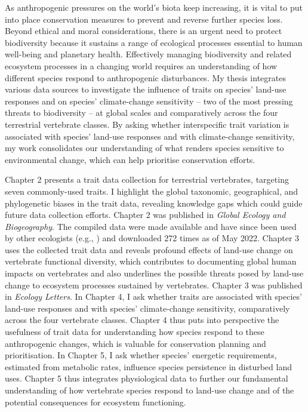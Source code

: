 As anthropogenic pressures on the world’s biota keep increasing, it is vital to put into place conservation measures to prevent and reverse further species loss. Beyond ethical and moral considerations, there is an urgent need to protect biodiversity because it sustains a range of ecological processes essential to human well-being and planetary health. Effectively managing biodiversity and related ecosystem processes in a changing world requires an understanding of how different species respond to anthropogenic disturbances. My thesis integrates various data sources to investigate the influence of traits on species' land-use responses and on species' climate-change sensitivity -- two of the most pressing threats to biodiversity -- at global scales and comparatively across the four terrestrial vertebrate classes. By asking whether interspecific trait variation is associated with species' land-use responses and with climate-change sensitivity, my work consolidates our understanding of what renders species sensitive to environmental change, which can help prioritise conservation efforts. 
 
Chapter 2 presents a trait data collection for terrestrial vertebrates, targeting seven commonly-used traits. I highlight the global taxonomic, geographical, and phylogenetic biases in the trait data, revealing knowledge gaps which could guide future data collection efforts. Chapter 2 was published in \textit{Global Ecology and Biogeography}. The compiled data were made available and have since been used by other ecologists (e.g., \citet{Capdevila2022b}) and downloaded 272 times as of May 2022.  Chapter 3 uses the collected trait data and reveals profound effects of land-use change on vertebrate functional diversity, which contributes to documenting global human impacts on vertebrates and also underlines the possible threats posed by land-use change to ecosystem processes sustained by vertebrates. Chapter 3 was published in \textit{Ecology Letters}. In Chapter 4, I ask whether traits are associated with species' land-use responses and with species' climate-change sensitivity, comparatively across the four vertebrate classes. Chapter 4 thus puts into perspective the usefulness of trait data for understanding how species respond to these anthropogenic changes, which is valuable for conservation planning and prioritisation. In Chapter 5, I ask whether species' energetic requirements, estimated from metabolic rates, influence species persistence in disturbed land uses. Chapter 5 thus integrates physiological data to further our fundamental understanding of how vertebrate species respond to land-use change and of the potential consequences for ecosystem functioning. 

